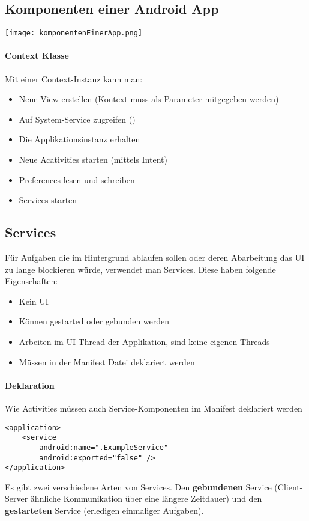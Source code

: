 \subsection{Komponenten einer Android App}
\texttt{[image: komponentenEinerApp.png]}
\paragraph{Context Klasse} Mit einer Context-Instanz kann man:
\begin{itemize}
\item Neue View erstellen (Kontext muss als Parameter mitgegeben werden)
\item Auf System-Service zugreifen ()
\item Die Applikationsinstanz erhalten
\item Neue Acativities starten (mittels Intent)
\item Preferences lesen und schreiben
\item Services starten
\end{itemize}
\subsection{Services}
Für Aufgaben die im Hintergrund ablaufen sollen oder deren Abarbeitung das UI zu lange blockieren würde, verwendet man Services. Diese haben folgende Eigenschaften:
\begin{itemize}
\item Kein UI
\item Können gestarted oder gebunden werden
\item Arbeiten im UI-Thread der Applikation, sind keine eigenen Threads
\item Müssen in der Manifest Datei deklariert werden
\end{itemize}
\paragraph{Deklaration} Wie Activities müssen auch Service-Komponenten im Manifest deklariert werden
\begin{lstlisting}
<application>
    <service 
        android:name=".ExampleService"
        android:exported="false" />
</application>
\end{lstlisting}
Es gibt zwei verschiedene Arten von Services. Den \textbf{gebundenen} Service (Client-Server ähnliche Kommunikation über eine längere Zeitdauer) und den \textbf{gestarteten} Service (erledigen einmaliger Aufgaben).
